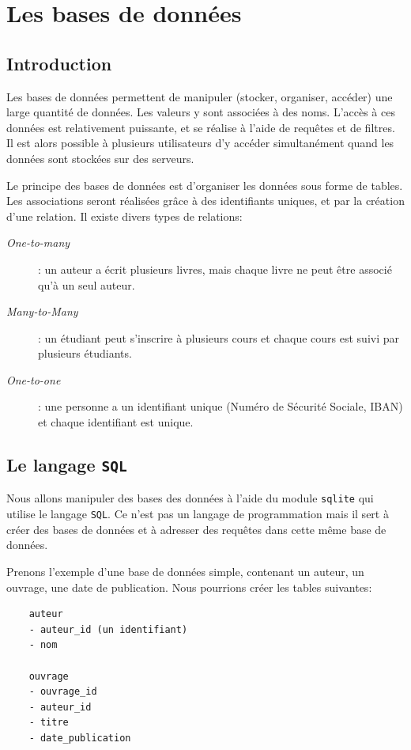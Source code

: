\documentclass[a4paper,11pt]{book}
\begin{document}
\chapter{Les bases de données}
\section{Introduction}
Les bases de données permettent de manipuler (stocker, organiser, accéder) une large quantité de données. Les valeurs y sont associées à des noms. L'accès à ces données est relativement puissante, et se réalise à l'aide de requêtes et de filtres. Il est alors possible à plusieurs utilisateurs d'y accéder simultanément quand les données sont stockées sur des serveurs.
\medskip

Le principe des bases de données est d'organiser les données sous forme de tables. Les associations seront réalisées grâce à des identifiants uniques, et par la création d'une relation. Il existe divers types de relations:
\begin{description}
	\item[\textit{One-to-many}]: un auteur a écrit plusieurs livres, mais chaque livre ne peut être associé qu'à un seul auteur.
	\item[\textit{Many-to-Many}]: un étudiant peut s'inscrire à plusieurs cours et chaque cours est suivi par plusieurs étudiants.
	\item[\textit{One-to-one}]: une personne a un identifiant unique (Numéro de Sécurité Sociale, IBAN) et chaque identifiant est unique.
\end{description}
\medskip

\section{Le langage \texttt{SQL}}
Nous allons manipuler des bases des données à l'aide du module \texttt{sqlite} qui utilise le langage \texttt{SQL}. Ce n'est pas un langage de programmation mais il sert à créer des bases de données et à adresser des requêtes dans cette même base de données.
\medskip

Prenons l'exemple d'une base de données simple, contenant un auteur, un ouvrage, une date de publication. Nous pourrions créer les tables suivantes:
\begin{verbatim}
    auteur
    - auteur_id (un identifiant)
    - nom

    ouvrage
    - ouvrage_id
    - auteur_id
    - titre
    - date_publication
\end{verbatim}
\medskip
\end{document}
